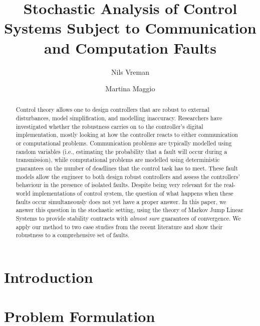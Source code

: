 \documentclass[manuscript,screen,review,anonymous]{acmart}
\begin{document}
\title{Stochastic Analysis of Control Systems Subject to Communication and Computation Faults}

\author{Nils Vreman}

\author{Martina Maggio}

\begin{abstract}
Control theory allows one to design controllers that are robust to external disturbances, model simplification, and modelling inaccuracy.
Researchers have investigated whether the robustness carries on to the controller's digital implementation, mostly looking at how the controller reacts to either communication or computational problems.
Communication problems are typically modelled using random variables (i.e., estimating the probability that a fault will occur during a transmission), while computational problems are modelled using deterministic guarantees on the number of deadlines that the control task has to meet.
These fault models allow the engineer to both design robust controllers and assess the controllers' behaviour in the presence of isolated faults.
Despite being very relevant for the real-world implementations of control system, the question of what happens when these faults occur simultaneously does not yet have a proper answer.
In this paper, we answer this question in the stochastic setting, using the theory of Markov Jump Linear Systems to provide stability contracts with \emph{almost sure} guarantees of convergence.
We apply our method to two case studies from the recent literature and show their robustness to a comprehensive set of faults.
\end{abstract}

\maketitle

\section{Introduction}
\label{sec:intro}


\section{Problem Formulation}
\label{sec:prb}

\end{document}
